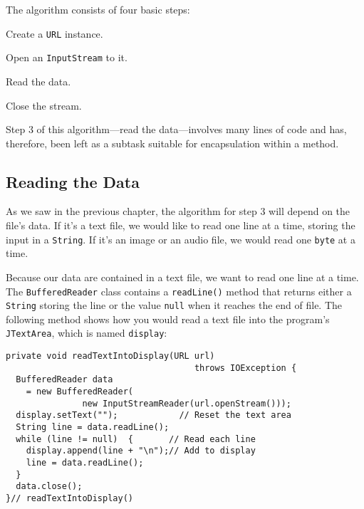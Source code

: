{\noindent  The algorithm consists of four basic steps:

\begin{BL}
\item  Create a {\tt URL} instance.
\item  Open an {\tt InputStream} to it.
\item  Read the data.
\item  Close the stream.
\end{BL}

\noindent Step 3 of this algorithm---read the data---involves many
lines of code and has, therefore, been left as a subtask suitable for
encapsulation within a method.


\subsection*{Reading the Data}
\noindent As we saw in the previous chapter, the algorithm for step 3 will
depend on the file's data.  If it's a text file, we would like to read
one line at a time, storing the input in a {\tt String}.  If it's an
image or an audio file, we would read one {\tt byte} at a time.

Because our data are contained in a text file, we want to read one
line at a time.  The {\tt BufferedReader} class contains a
{\tt readLine()} method that returns either a {\tt String} storing
the line or the value {\tt null} when it reaches the end of file.
The following method shows how you would read a text file into
the program's {\tt JTextArea}, which is named {\tt display}:

\begin{jjjlisting}
\begin{lstlisting}
private void readTextIntoDisplay(URL url) 
                                     throws IOException {
  BufferedReader data
    = new BufferedReader(
               new InputStreamReader(url.openStream()));
  display.setText("");            // Reset the text area
  String line = data.readLine();
  while (line != null)  {       // Read each line
    display.append(line + "\n");// Add to display
    line = data.readLine();
  }
  data.close();
}// readTextIntoDisplay()
\end{lstlisting}
\end{jjjlisting}

}
